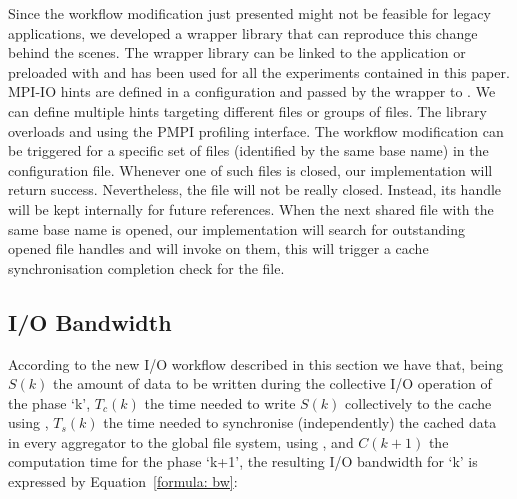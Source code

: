 Since the workflow modification just presented might not be feasible for legacy applications, we developed a wrapper library that can reproduce this change behind the scenes. The wrapper library can be linked to the application or preloaded with  and has been used for all the experiments contained in this paper. MPI-IO hints are defined in a configuration %
and passed by the wrapper to . %
We can define multiple hints targeting different files or groups of files. The library overloads  and  using the PMPI profiling interface. The workflow modification can be triggered for a specific set of files (identified by the same base name) in the configuration file. Whenever one of such files is closed, our  implementation will return success. Nevertheless, the file will not be really closed. Instead, its handle will be kept internally for future references. When the next shared file with the same base name is opened, our  implementation will search for outstanding opened file handles and will invoke  on them, this will trigger a cache synchronisation completion check for the file.

\subsection{I/O Bandwidth}
\label{subsec: bw-impr}
According to the new I/O workflow described in this section we have that, being $S(k)$ the amount of data to be written during the collective I/O operation of the phase `k', $T_c(k)$ the time needed to write $S(k)$ collectively to the cache using , $T_s(k)$ the time needed to synchronise (independently) the cached data in every aggregator to the global file system, using , and $C(k+1)$ the computation time for the phase `k+1', the resulting I/O bandwidth for `k' is expressed by Equation~\ref{formula: bw}:

